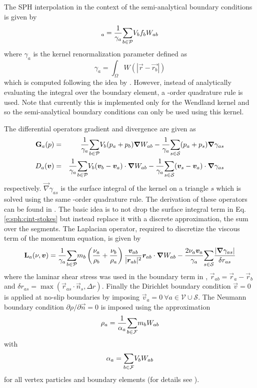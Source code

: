 \documentclass{../GPUSPHtemplate}
\begin{document}
The SPH interpolation in the context of the semi-analytical boundary conditions is given by
\begin{equation}
[f]_a = \frac{1}{\gamma_a}\sumP V_b f_b W_{ab}
\label{e:sa:int}
\end{equation}
where $\gamma_a$ is the kernel renormalization parameter defined as
\begin{equation}
\gamma_a = \int_\Omega W(|\vec{r}-\vec{r_b}|)
\label{e:sa:gam}
\end{equation}
which is computed following the idea by
\cite{violeau_exact_2014}. However, instead of analytically evaluating
the integral over the boundary element, a -order quadrature rule
is used. Note that currently this is implemented only for the Wendland
kernel and so the semi-analytical boundary conditions can only be used
using this kernel.

The differential operators gradient and divergence are given as
\begin{eqnarray}
\textbf{G}_a(p) &=& \frac{1}{\gamma_a}\underset{b \in \mathcal{P}}{\sum} V_b (p_a+p_b) \bm{\nabla} W_{ab}
 -\frac{1}{\gamma_a}\underset{s \in \mathcal{S}}{\sum} (p_a + p_s) \bm{\nabla} \gamma_{as}
\label{e:sa:grad}
\\
D_a(\bm{v}) &=& \frac{1}{\gamma_a}\underset{b \in \mathcal{P}}{\sum} V_b (\bm{v}_b - \bm{v}_a) \cdot \bm{\nabla} W_{ab}
 -\frac{1}{\gamma_a}\underset{s \in \mathcal{S}}{\sum} (\bm{v}_s - \bm{v}_a) \cdot \bm{\nabla} \gamma_{as}
\label{e:sa:div}
\end{eqnarray}
respectively. $\vec{\nabla} \gamma_{as}$ is the surface integral of the kernel
on a triangle $s$ which is solved using the same -order
quadrature rule. The derivation of these operators can be found in
\cite{ferrand_unified_2012}. The basic idea is to not drop the surface
integral term in Eq. \eqref{e:sph:cint-stokes} but instead replace it
with a discrete approximation, \ie the sum over the segments. The Laplacian operator, required to discretize the viscous term of the momentum equation, is given by
\begin{equation}
\textbf{L}_a(\nu, \bm{v}) = \frac{1}{\gamma_a}\underset{b \in \mathcal{P}}{\sum} m_b \left(\frac{\nu_a}{\rho_b} + \frac{\nu_b}{\rho_a}\right) \frac{\bm{v}_{ab}}{|\bm{r}_{ab}|^2}\bm{r}_{ab}\cdot \bm{\nabla} W_{ab}
 - \frac{2 \nu_a \bm{v}_a}{\gamma_a} \underset{s \in \mathcal{S}}{\sum} \frac{|\bm{\nabla} \gamma_{as}|}{\delta r_{as}}
\label{e:sa:lap}
\end{equation}
where the laminar shear stress was used in the boundary term in \cite{ferrand_unified_2012}, $\vec{r}_{ab} = \vec{r}_a - \vec{r}_b$ and $\delta r_{as} = \max(\vec{r}_{as}\cdot\vec{n}_s, \Delta r)$. Finally the Dirichlet boundary condition $\vec{v} = 0$ is applied at no-slip boundaries by imposing $\vec{v}_a = 0\ \forall a \in \mathcal{V} \cup \mathcal{S}$. The Neumann boundary condition $\partial \rho/\partial \vec{n} = 0$ is imposed using the approximation
\begin{equation}
\rho_a = \frac{1}{\alpha_a}\underset{b \in \mathcal{F}}{\sum} m_b W_{ab}
\end{equation}
with
\begin{equation}
\alpha_a = \underset{b \in \mathcal{F}}{\sum} V_b W_{ab}
\label{e:sa:alpha}
\end{equation}
for all vertex particles and boundary elements (for details see \cite{mayrhofer_investigation_2013}).
\end{document}
